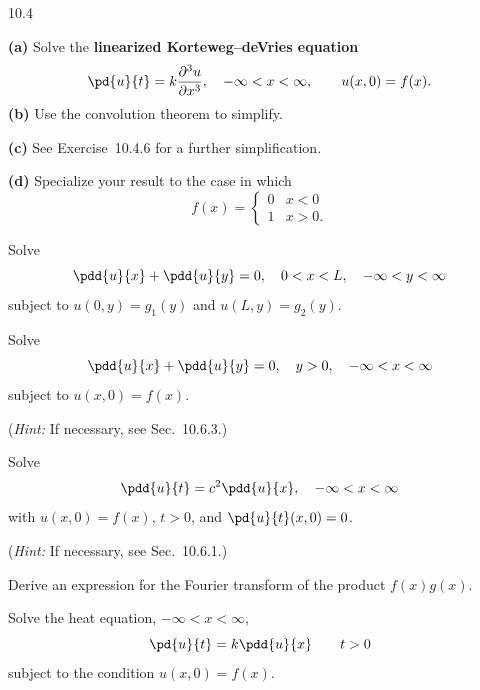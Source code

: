 \begin{exercises}{10.4}
\item \textbf{(a)} Solve the \textbf{linearized Korteweg--deVries equation}
\[
\pd{u}{t} = k\frac{\partial^3 u}{\partial x^3}, \quad -\infty < x < \infty, \qquad u(x,0) = f(x).
\]
\textbf{(b)} Use the convolution theorem to simplify.

\textbf{\starred (c)} See Exercise~10.4.6 for a further simplification.

\textbf{(d)} Specialize your result to the case in which
\[
f(x) = \begin{cases} 0 & x < 0 \\ 1 & x > 0. \end{cases}
\]

\item Solve
\[
\pdd{u}{x} + \pdd{u}{y} = 0, \quad 0 < x < L, \quad -\infty < y < \infty
\]
subject to $u(0,y) = g_1(y)$ and $u(L,y) = g_2(y)$.

\item Solve
\[
\pdd{u}{x} + \pdd{u}{y} = 0, \quad y > 0, \quad -\infty < x < \infty
\]
subject to $u(x,0) = f(x)$.

(\textit{Hint:} If necessary, see Sec.~10.6.3.)

\item Solve
\[
\pdd{u}{t} = c^2\pdd{u}{x}, \quad -\infty < x < \infty
\]
with $u(x,0) = f(x)$, $t > 0$, and $\pd{u}{t}(x,0) = 0$.

(\textit{Hint:} If necessary, see Sec.~10.6.1.)

\item Derive an expression for the Fourier transform of the product $f(x)g(x)$.

\item Solve the heat equation, $-\infty < x < \infty$,
\[
\pd{u}{t} = k\pdd{u}{x} \qquad t > 0
\]
subject to the condition $u(x,0) = f(x)$.
\end{exercises}
